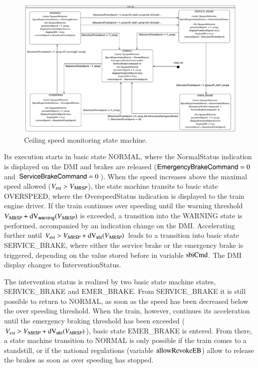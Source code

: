 \begin{figure}
 \centering
\includegraphics[width=\textwidth]{CSM-StateMachine.pdf}
\caption{Ceiling speed monitoring state machine.}
 \label{fig:csmsm}
 \end{figure}


Its execution starts in basic state {\sf NORMAL}, where the {\sf NormalStatus}
indication is displayed on the DMI and brakes are released 
($\mathsf{EmergencyBrakeCommand} = 0$ and $\mathsf{ServiceBrakeCommand} = 0$). When the speed increases above the
maximal speed allowed (${V_{\text{\sl est}}} > {V_{\text{\sl MRSP}}}$), the state machine transits to
basic state {\sf OVERSPEED}, where the {\sf OverspeedStatus} indication is displayed to the train engine driver. If the train continues over speeding until the warning threshold ${V_{\text{\sl MRSP}}} + \text{dV}_{\mathsf{warning}}({V_{\text{\sl MRSP}}})$ is exceeded, a transition
into the {\sf WARNING} state is performed, accompanied by an
indication change on the DMI. Accelerating further until ${V_{\text{\sl est}}} >
{V_{\text{\sl MRSP}}} + \text{dV}_{\mathsf{sbi}}({V_{\text{\sl MRSP}}})$ leads to a transition into basic state {\sf
  SERVICE\_BRAKE}, where either the service brake or the emergency
brake is triggered, depending on the value stored before in variable
$\text{sbiCmd}$. The DMI display changes to {\sf InterventionStatus}. 


 

The intervention status is realized by two basic state machine states, {\sf SERVICE\_BRAKE} and
{\sf EMER\_BRAKE}. From {\sf SERVICE\_BRAKE} it is still possible to return to {\sf NORMAL}, as soon as the speed has been decreased below the over speeding threshold. When the train, however, continues its acceleration until the emergency braking threshold has been exceeded (${V_{\text{\sl est}}} > {V_{\text{\sl MRSP}}}+\text{dV}_{\mathsf{ebi}}({V_{\text{\sl MRSP}}})$), basic state {\sf EMER\_BRAKE} is entered. From there, a state machine transition to {\sf NORMAL} is only possible if the train comes to a standstill, or if the national regulations (variable $\text{allowRevokeEB}$)
allow to release the brakes as soon as over speeding has stopped.

